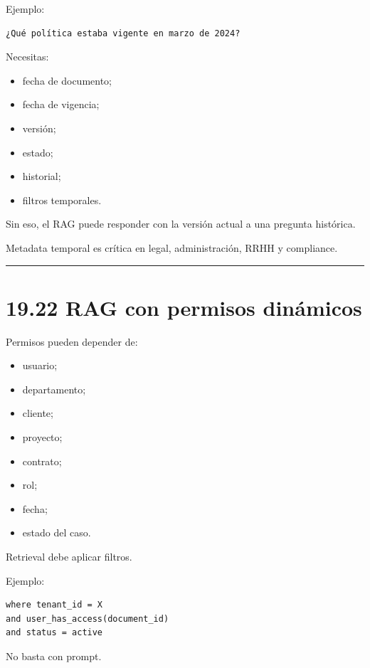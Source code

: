 Ejemplo:

\begin{lstlisting}
¿Qué política estaba vigente en marzo de 2024?
\end{lstlisting}

Necesitas:

\begin{itemize}
\tightlist
\item
  fecha de documento;
\item
  fecha de vigencia;
\item
  versión;
\item
  estado;
\item
  historial;
\item
  filtros temporales.
\end{itemize}

Sin eso, el RAG puede responder con la versión actual a una pregunta
histórica.

Metadata temporal es crítica en legal, administración, RRHH y
compliance.

\begin{center}\rule{0.5\linewidth}{0.5pt}\end{center}

\section{19.22 RAG con permisos
dinámicos}\label{rag-con-permisos-dinuxe1micos}

Permisos pueden depender de:

\begin{itemize}
\tightlist
\item
  usuario;
\item
  departamento;
\item
  cliente;
\item
  proyecto;
\item
  contrato;
\item
  rol;
\item
  fecha;
\item
  estado del caso.
\end{itemize}

Retrieval debe aplicar filtros.

Ejemplo:

\begin{lstlisting}
where tenant_id = X
and user_has_access(document_id)
and status = active
\end{lstlisting}

No basta con prompt.

